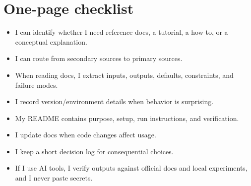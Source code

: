 \section{One-page checklist}
\begin{itemize}[noitemsep]
  \item I can identify whether I need reference docs, a tutorial, a how-to, or a conceptual explanation.
  \item I can route from secondary sources to primary sources.
  \item When reading docs, I extract inputs, outputs, defaults, constraints, and failure modes.
  \item I record version/environment details when behavior is surprising.
  \item My README contains purpose, setup, run instructions, and verification.
  \item I update docs when code changes affect usage.
  \item I keep a short decision log for consequential choices.
  \item If I use AI tools, I verify outputs against official docs and local experiments, and I never paste secrets.
\end{itemize}

